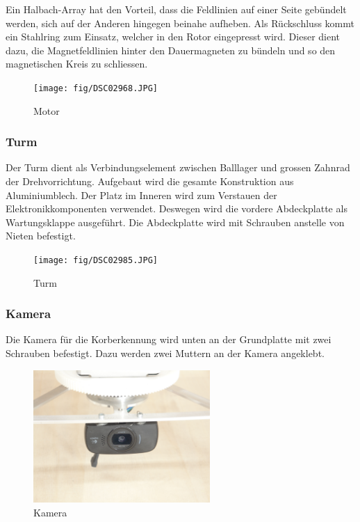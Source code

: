 \noindent
Ein Halbach-Array hat den Vorteil, dass die Feldlinien auf einer 
Seite gebündelt werden, sich auf der Anderen hingegen beinahe aufheben. 
Als Rückschluss kommt ein Stahlring zum Einsatz, welcher in den Rotor 
eingepresst wird. Dieser dient dazu, die Magnetfeldlinien hinter den 
Dauermagneten zu bündeln und so den magnetischen Kreis zu schliessen. 

\begin{figure}[h!]
    \centering
    \texttt{[image: fig/DSC02968.JPG]}
    \caption{Motor}
    \label{fig:motor}
\end{figure}

\clearpage
\subsubsection{Turm}
\label{sec:turm}
Der Turm dient als Verbindungselement zwischen Balllager und grossen Zahnrad 
der Drehvorrichtung. Aufgebaut wird die gesamte Konstruktion aus 
Aluminiumblech. Der Platz im Inneren wird zum Verstauen der 
Elektronikkomponenten verwendet. Deswegen wird die vordere Abdeckplatte als 
Wartungsklappe ausgeführt. Die Abdeckplatte wird mit Schrauben anstelle von 
Nieten befestigt.
\begin{figure}[h!]
    \centering
    \texttt{[image: fig/DSC02985.JPG]}
    \caption{Turm}
    \label{fig:turm}
\end{figure}

\subsubsection{Kamera}
\label{sec:camera}
Die Kamera für die Korberkennung wird unten an der Grundplatte mit zwei 
Schrauben befestigt. Dazu werden zwei Muttern an der Kamera angeklebt. 
\begin{figure}[h!]
    \centering
    \includegraphics[width=0.6\textwidth, trim=400 400 400 400, clip=true]{fig/DSC02993.JPG}
    \caption{Kamera}
    \label{fig:camera}
\end{figure}
